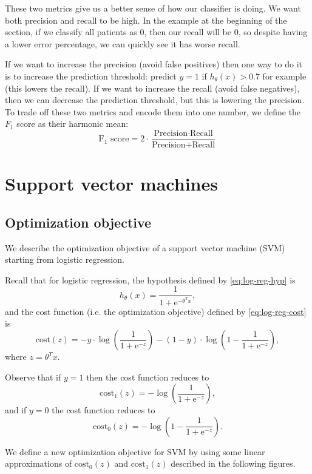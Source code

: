 \documentclass[a4paper,11pt]{report}
\begin{document}
These two metrics give us a better sense of how our classifier is doing. We want both precision and recall to be high. In the example at the beginning of the section, if we classify all patients as 0, then our recall will be $0$, so despite having a lower error percentage, we can quickly see it has worse recall.

If we want to increase the precision (avoid false positives) then one way to do it is to increase the prediction threshold: predict $y=1$ if $h_\theta(x) > 0.7$ for example (this lowers the recall). If we want to increase the recall (avoid false negatives), then we can decrease the prediction threshold, but this is lowering the precision. To trade off these two metrics and encode them into one number, we define the $F_1$ score as their harmonic mean:
\begin{equation}\label{df:F1score}
\textrm{F}_1 \textrm{ score} = 2\cdot \dfrac{\textrm{Precision}\cdot \textrm{Recall}}{\textrm{Precision}+ \textrm{Recall}}
\end{equation}




\chapter{Support vector machines}

\section{Optimization objective}

We describe the optimization objective of a support vector machine (SVM) starting from logistic regression.

Recall that for logistic regression, the hypothesis defined by \ref{eq:log-reg-hyp} is
$$h_\theta(x) = \dfrac{1}{1 + \mathrm{e}^{-\theta^Tx}},$$
and the cost function (i.e. the optimization objective) defined by \ref{eq:log-reg-cost} is
$$\text{cost}(z) = -y\cdot\log\left(\dfrac{1}{1 + \mathrm{e}^{-z}}\right) - (1-y)\cdot\log\left(1-\dfrac{1}{1 + \mathrm{e}^{-z}}\right),$$
where $z = \theta^Tx$.

Observe that if $y=1$ then the cost function reduces to
$$\text{cost}_1(z) = -\log\left(\dfrac{1}{1 + \mathrm{e}^{-z}}\right),$$
and if $y=0$ the cost function reduces to
$$\text{cost}_0(z) = -\log\left(1-\dfrac{1}{1 + \mathrm{e}^{-z}}\right).$$

We define a new optimization objective for SVM by using some linear approximations of $\text{cost}_0(z)$ and $\text{cost}_1(z)$ described in the following figures.
\end{document}
